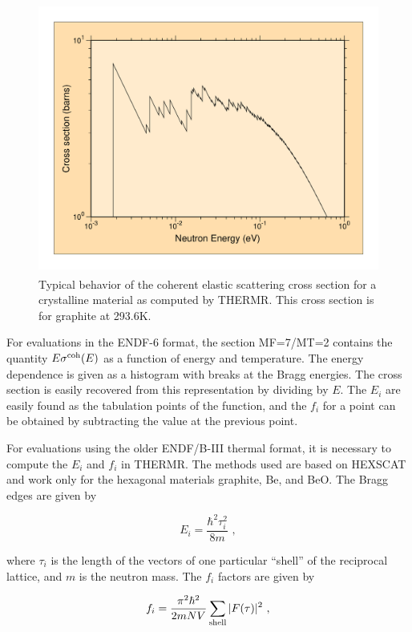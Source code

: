 \begin{figure}[thb]\centering
\includegraphics[keepaspectratio,height=3.5in, angle=0]{figs/thermr1ack}
\caption[Example of coherent elastic cross section for a crystalline
material (graphite)]
 {Typical behavior of the coherent elastic scattering cross section for a
 crystalline material as computed by THERMR. This cross section is for
 graphite at 293.6K.}
\label{cohfig}
\end{figure}

For evaluations in the ENDF-6 format, the section MF=7/MT=2 contains
the quantity $E\sigma^{\rm coh}(E)$ as a function of energy and
temperature. The energy dependence is given as a histogram with breaks
at the Bragg energies.  The cross section is easily recovered from this
representation by dividing by $E$.  The $E_i$ are easily found as the
tabulation points of the function, and the $f_i$ for a point can be
obtained by subtracting the value at the previous point.

For evaluations using the older ENDF/B-III thermal format, it is
necessary to compute the $E_i$ and $f_i$ in THERMR.  The methods used
are based on HEXSCAT and work only for the hexagonal
materials graphite, Be, and BeO.  The Bragg edges are given by

\begin{equation}
   E_i=\frac{\hbar^2\tau_i^2}{8m}\,\,,
\end{equation}

\noindent
where $\tau_i$ is the length of the vectors of one particular
``shell'' of the reciprocal lattice, and $m$ is the neutron mass.
The $f_i$ factors are given by

\begin{equation}
   f_i=\frac{\pi^2\hbar^2}{2mNV}\sum_{\rm shell}|F(\tau)|^2\,\,,
\end{equation}

